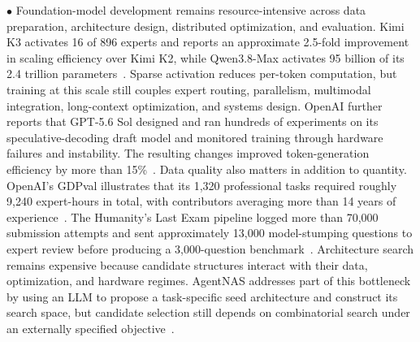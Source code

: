 


\noindent$\bullet$  Foundation-model development remains resource-intensive across data preparation, architecture design, distributed optimization, and evaluation. Kimi K3 activates 16 of 896 experts and reports an approximate 2.5-fold improvement in scaling efficiency over Kimi K2, while Qwen3.8-Max activates 95 billion of its 2.4 trillion parameters~\cite{moonshot2026kimik3,alibaba2026qwen38max}. Sparse activation reduces per-token computation, but training at this scale still couples expert routing, parallelism, multimodal integration, long-context optimization, and systems design. OpenAI further reports that GPT-5.6 Sol designed and ran hundreds of experiments on its speculative-decoding draft model and monitored training through hardware failures and instability. The resulting changes improved token-generation efficiency by more than 15\%~\cite{openai2026gpt56efficiency}. Data quality also matters in addition to quantity. OpenAI's GDPval illustrates that its 1,320 professional tasks required roughly 9,240 expert-hours in total, with contributors averaging more than 14 years of experience~\cite{openai2025gdpval}. The Humanity's Last Exam pipeline logged more than 70,000 submission attempts and sent approximately 13,000 model-stumping questions to expert review before producing a 3,000-question benchmark~\cite{phan2025hle}. Architecture search remains expensive because candidate structures interact with their data, optimization, and hardware regimes. AgentNAS addresses part of this bottleneck by using an LLM to propose a task-specific seed architecture and construct its search space, but candidate selection still depends on combinatorial search under an externally specified objective~\cite{jeong2026agentnas}.


